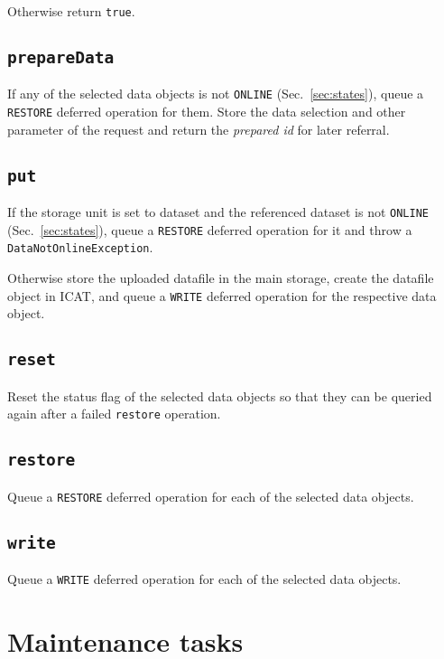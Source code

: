 \documentclass[paper=a4]{scrartcl}
\begin{document}
Otherwise return \texttt{true}.

\subsection{\texttt{prepareData}}
\label{sec:requests:prepareData}

If any of the selected data objects is not \texttt{ONLINE}
(Sec.~\ref{sec:states}), queue a \texttt{RESTORE} deferred operation
for them.  Store the data selection and other parameter of the request
and return the \emph{prepared id} for later referral.

\subsection{\texttt{put}}
\label{sec:requests:put}

If the storage unit is set to dataset and the referenced dataset is
not \texttt{ONLINE} (Sec.~\ref{sec:states}), queue a \texttt{RESTORE}
deferred operation for it and throw a \texttt{DataNotOnlineException}.

Otherwise store the uploaded datafile in the main storage, create the
datafile object in ICAT, and queue a \texttt{WRITE} deferred operation
for the respective data object.

\subsection{\texttt{reset}}

Reset the status flag of the selected data objects so that they can
be queried again after a failed \texttt{restore} operation.

\subsection{\texttt{restore}}

Queue a \texttt{RESTORE} deferred operation for each of the selected
data objects.

\subsection{\texttt{write}}

Queue a \texttt{WRITE} deferred operation for each of the selected
data objects.


\section{Maintenance tasks}
\label{sec:maintenance}
\end{document}
